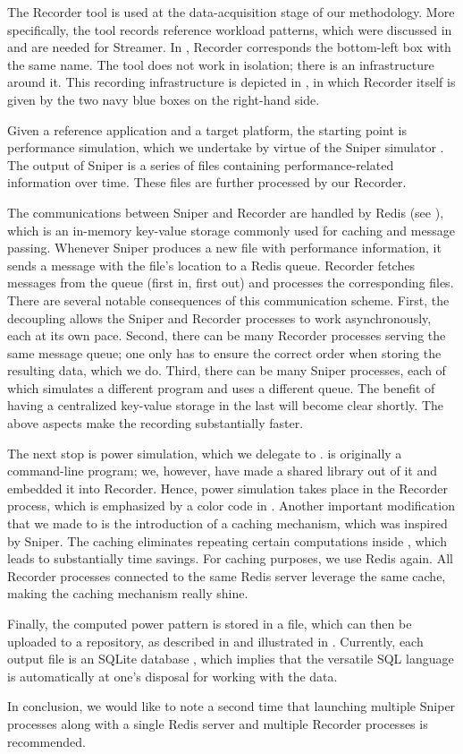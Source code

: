 
The Recorder tool is used at the data-acquisition stage of our methodology. More
specifically, the tool records reference workload patterns, which were discussed
in  and are needed for Streamer. In , Recorder
corresponds the bottom-left box with the same name. The tool does not work in
isolation; there is an infrastructure around it. This recording infrastructure
is depicted in , in which Recorder itself is given by the two
navy blue boxes on the right-hand side.

Given a reference application and a target platform, the starting point is
performance simulation, which we undertake by virtue of the Sniper simulator
\cite{carlson2011}. The output of Sniper is a series of files containing
performance-related information over time. These files are further processed by
our Recorder.

The communications between Sniper and Recorder are handled by Redis (see
), which is an in-memory key-value storage commonly used for
caching and message passing. Whenever Sniper produces a new file with
performance information, it sends a message with the file's location to a Redis
queue. Recorder fetches messages from the queue (first in, first out) and
processes the corresponding files. There are several notable consequences of
this communication scheme. First, the decoupling allows the Sniper and Recorder
processes to work asynchronously, each at its own pace. Second, there can be
many Recorder processes serving the same message queue; one only has to ensure
the correct order when storing the resulting data, which we do. Third, there can
be many Sniper processes, each of which simulates a different program and uses a
different queue. The benefit of having a centralized key-value storage in the
last will become clear shortly. The above aspects make the recording
substantially faster.

The next stop is power simulation, which we delegate to 
\cite{li2009}.  is originally a command-line program; we, however,
have made a shared library out of it and embedded it into Recorder. Hence, power
simulation takes place in the Recorder process, which is emphasized by a color
code in . Another important modification that we made to
 is the introduction of a caching mechanism, which was inspired by
Sniper. The caching eliminates repeating certain computations inside ,
which leads to substantially time savings. For caching purposes, we use Redis
again. All Recorder processes connected to the same Redis server leverage the
same cache, making the caching mechanism really shine.

Finally, the computed power pattern is stored in a file, which can then be
uploaded to a repository, as described in  and illustrated in
. Currently, each output file is an SQLite database
\cite{sqlite}, which implies that the versatile SQL language is automatically at
one's disposal for working with the data.

In conclusion, we would like to note a second time that launching multiple
Sniper processes along with a single Redis server and multiple Recorder
processes is recommended.
